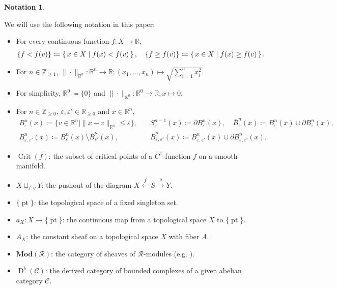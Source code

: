 \documentclass[a4paper,dvipdfmx,reqno,12pt]{amsart}
\theoremstyle{definition}
\newtheorem{notation}[theorem]{Notation}
\newcommand{\deq}{\coloneqq}
\newcommand{\opn}[1]{\operatorname{#1}}
\newcommand{\catn}[1]{\mathbf{#1}}
\newcommand{\xto}[1]{\xrightarrow{#1}}
\newcommand{\xgets}[1]{\xleftarrow{#1}}
\numberwithin{equation}{section}
\begin{document}
\begin{notation} \label{notation-general}

We will use the following notation in this paper:

\begin{itemize}

\setlength{\parskip}{0pt}
\setlength{\leftskip}{-20pt}

\item For every continuous function $f\colon X\to {\mathbb{R}}$,
\begin{align*}
\{f<f(v)\}\deq \set{x\in X\mid f(x)< f(v)},\quad
\{f\geq f(v)\}\deq \set{x\in X\mid f(x)\geq f(v)}.
\end{align*}
\item  For $n\in \mathbb{Z}_{\geq 1}$,
$\|\cdot \|_{\mathbb{R}^{n}}\colon 
\mathbb{R}^{n}\to \mathbb{R};(x_1,\ldots,x_n)\mapsto 
\sqrt{\sum_{i=1}^{n}x_i^{2}}$.
\item For simplicity, $\mathbb{R}^{0}\deq \{0\}$ 
and 
$\|\cdot\|_{\mathbb{R}^{0}}\colon \mathbb{R}^{0}\to \mathbb{R}
; x\mapsto 0$.
\item For $n\in \mathbb{Z}_{\geq 0}$, $\varepsilon,\varepsilon'\in \mathbb{R}_{\geq 0}$
and $x \in \mathbb{R}^{n}$, 
\begin{align*}
B^{n}_{\varepsilon}(x)\deq 
\{v\in \mathbb{R}^{n}\mid \|x-v\|_{\mathbb{R}^{n}}
\leq \varepsilon\},
& \quad  
S^{n-1}_{\varepsilon}(x)\deq \partial B^{n}_{\varepsilon}(x),
\quad \bar{B}^{n}_{\varepsilon}(x)\deq 
B^{n}_{\varepsilon}(x)\cup \partial B^{n}_{\varepsilon}(x),  \\
B_{\varepsilon,\varepsilon'}^{n}(x)\deq 
B^{n}_{\varepsilon}(x)\setminus 
\bar{B}^{n}_{\varepsilon '}(x), 
& \quad \bar{B}_{\varepsilon,\varepsilon'}^{n}(x)\deq 
B_{\varepsilon,\varepsilon'}^{n}(x)\cup 
\partial B_{\varepsilon,\varepsilon'}^{n}(x).
\end{align*}
\item $\opn{Crit}(f)$: the subset of critical points of
a $C^{1}$-function $f$ on a smooth manifold.
\item   $X\sqcup_{f,g}Y$: the pushout of the diagram
  $X\xgets{f} S\xto{g} Y$.
\item $\{\opn{pt}\}$: the topological space of 
a fixed singleton set.
\item $a_X\colon X\to \{\opn{pt}\}$:
the continuous map from a topological space $X$ to
$\{\opn{pt}\}$.
\item $A_X$: the constant sheaf on a topological space $X$ 
with fiber $A$.
\item $\catn{Mod}(\mathcal{R})$: the category of 
sheaves of $\mathcal{R}$-modules
(e.g. \cite[Definition 2.2.6]{MR1299726}).
\item $\opn{D}^{b}(\mathcal{C})$: the derived category
of bounded complexes of a given abelian category 
$\mathcal{C}$.
\end{itemize}

\end{notation}
\end{document}
